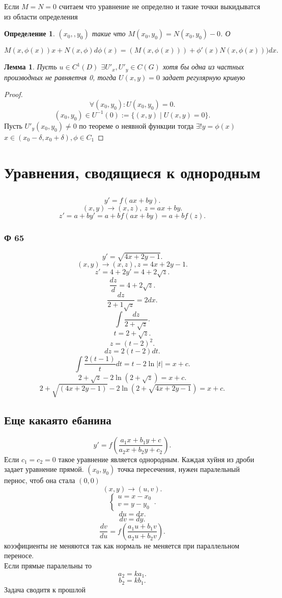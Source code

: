 \documentclass[14pt]{extarticle}
\newtheorem{definition}{Определение}
\newtheorem{lemma}[theorem]{Лемма}
\begin{document}
Если $M = N = 0$ считаем что уравнение не определно и такие точки выкидыватся из области определения
\begin{definition}
	$(x_0,,y_0)$ такие что  $M(x_0,y_0) = N(x_0,y_0) - 0$. О
\end{definition}
\[
	M(x,\phi(x))x + N(x,\phi) d\phi(x) =
	(M(x,\phi(x))) + \phi'(x) N(x,\phi(x)))dx
	.\]
\begin{lemma}
	Пусть $u \in C^{1}(D)$ $\exists U'_{x}, U'_{y} \in C(G)$ хотя бы одна из частных производных не равняетчя 0, тогда  $U(x,y) = 0$ задает регулярную кривую
\end{lemma}
\begin{proof}
	\[
		\forall  (x_0,y_0) : U(x_0,y_0) = 0
		.\]
	\[
		(x_0,y_0) \in U^{-1}(0) := \{(x,y) \mid U(x,y) = 0\}
		.\]
	Пусть $U'_{y}(x_0,y_0) \neq 0$ по теореме о неявной функции тогда $\exists ! y = \phi(x)$ $x \in (x_0-\delta,x_0 + \delta), \phi \in C_1$
\end{proof}
\section{Уравнения, сводящиеся к однородным}
\subsection{}
\[
	y' = f(ax + by)
	.\]
\[
	(x,y) \to (x,z),~ z = ax + by
	.\]
\[
	z' =a + by' = a + bf(ax + by) = a+ bf(z)
	.\]
\subsubsection{Ф 65}
\[
	y' = \sqrt{4x + 2y - 1}
	.\]
\[
	(x,y) \to (x,z) , z=4x + 2y - 1
	.\]
\[
	z' = 4 + 2y' = 4 + 2\sqrt{z}
	.\]
\[
	\frac{dz}{d} = 4 + 2\sqrt{z}
	.\]
\[
	\frac{dz}{2 + 1\sqrt{z} }= 2dx
	.\]
\[
	\int \frac{dz}{2 + \sqrt{z} }
	.\]
\[
	t = 2 + \sqrt{z}
	.\]
\[
	z = (t - 2)^2
	.\]
\[
	dz =  2(t-2)dt
	.\]
\[
	\int \frac{2(t - 1)}{t} dt = t - 2 \ln{|t|} = x+c
	.\]
\[
	2 + \sqrt{z}  - 2\ln{(2 + \sqrt{z} )}=  x+ c
	.\]
\[
	2 + \sqrt{(4x + 2y -1) } - 2\ln{(2 + \sqrt{4x + 2y - 1} )} = x +c
	.\]
\subsection{Еще какаято ебанина}
\[
	y' = f(\frac{a_1x + b_1y + c}{a_2 x + b_2 y + c_2})
	.\]
Если $c_1= c_2 = 0$ такое уравнение является однородным. Каждая хуйня из дроби задает уравнение прямой. $(x_0,y_0)$ точка пересечения, нужен паралельный пернос, чтоб она стала $(0,0)$
\[
	(x,y) \to (u,v)
	.\]
\[
	\begin{cases}
		u = x-x_0 \\
		v = y - y_0
	\end{cases}
	.\]
\[
	du = dx
	.\]
\[
	dv = dy
	.\]
\[
	\frac{dv}{du} = f (\frac{a_1 u + b_1 v}{a_2 u + b_2 v})
	.\]
коээфициенты не меняются так как нормаль не меняется при параллельном переносе.\\
Если прямые паралельны то
\[
	a_2 = k a_1
	.\]
\[
	b_2 = k b_1
	.\]
Задача сводитя к прошлой
\end{document}
